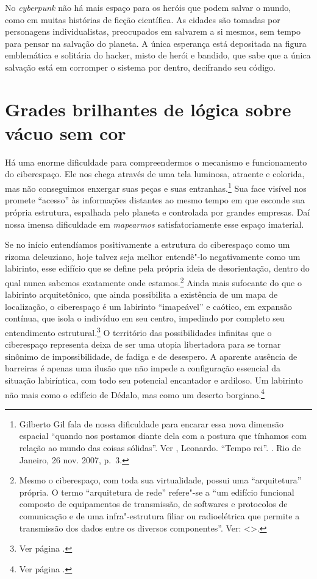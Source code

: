 No \emph{cyberpunk} não há mais espaço para os heróis que podem salvar o mundo,
como em muitas histórias de ficção científica. As cidades são tomadas
por personagens individualistas, preocupados em salvarem a si mesmos, sem
tempo para pensar na salvação do planeta. A única esperança está
depositada na figura emblemática e solitária do hacker, misto de herói e
bandido, que sabe que a única salvação está em corromper o sistema por
dentro, decifrando seu código.

\chapter{Grades brilhantes de lógica sobre vácuo sem cor}

Há uma enorme dificuldade para compreendermos o mecanismo e
funcionamento do ciberespaço. Ele nos chega através de uma tela
luminosa, atraente e colorida, mas não conseguimos enxergar suas peças e
suas entranhas.\footnote{Gilberto Gil fala de nossa dificuldade para
  encarar essa nova dimensão espacial ``quando nos postamos diante dela
  com a postura que tínhamos com relação ao mundo das coisas sólidas''.
  Ver , Leonardo. ``Tempo rei''. {}. Rio de Janeiro, 26
  nov. 2007, p.~3.} Sua face visível nos promete ``acesso'' às
informações distantes ao mesmo tempo em que esconde sua própria
estrutura, espalhada pelo planeta e controlada por grandes empresas. Daí
nossa imensa dificuldade em \emph{mapearmos} satisfatoriamente esse
espaço imaterial.

Se no início entendíamos positivamente a estrutura do ciberespaço como
um rizoma deleuziano, hoje talvez seja melhor entendê"-lo
negativamente como um labirinto, esse edifício que se define pela
própria ideia de desorientação, dentro do qual nunca sabemos exatamente
onde estamos.\footnote{Mesmo o ciberespaço, com toda sua virtualidade,
  possui uma ``arquitetura'' própria. O termo ``arquitetura de rede''
  refere"-se a ``um edifício funcional composto de equipamentos de
  transmissão, de softwares e protocolos de comunicação e de uma
  infra"-estrutura filiar ou radioelétrica que permite a transmissão dos
  dados entre os diversos componentes''. Ver: \textless{}{}\textgreater{}.} Ainda
mais sufocante do que o labirinto arquitetônico, que ainda possibilita a
existência de um mapa de localização, o ciberespaço é um labirinto ``imapeável'' e
caótico, em expansão contínua, que isola o indivíduo em seu
centro, impedindo por completo seu entendimento estrutural.\footnote{Ver
  página \pageref{labirinto}.} O território das possibilidades infinitas que o
ciberespaço representa deixa de ser uma utopia libertadora para se
tornar sinônimo de impossibilidade, de fadiga e de desespero. A aparente ausência
de barreiras é apenas uma ilusão que não impede a configuração
essencial da situação labiríntica, com todo seu potencial encantador e
ardiloso. Um labirinto não mais como o edifício de Dédalo, mas como um
deserto borgiano.\footnote{Ver página \pageref{borges}.}

